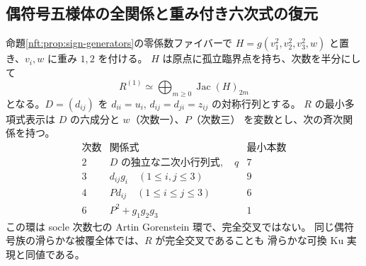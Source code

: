\subsection{偶符号五様体の全関係と重み付き六次式の復元}

\begin{proposition}[重み付き六次式と最小関係]\label{nft:prop:sign-presentation}
命題\ref{nft:prop:sign-generators}の零係数ファイバーで
$H=g(v_1^2,v_2^2,v_3^2,w)$ と置き、$v_i,w$ に重み $1,2$ を付ける。
$H$ は原点に孤立臨界点を持ち、次数を半分にして
\[
 R^{(1)}\simeq\bigoplus_{m\ge0}\operatorname{Jac}(H)_{2m}
\]
となる。$D=(d_{ij})$ を $d_{ii}=u_i$, $d_{ij}=d_{ji}=z_{ij}$ の対称行列とする。
$R$ の最小多項式表示は $D$ の六成分と $w$（次数一）、$P$（次数三）
を変数とし、次の斉次関係を持つ。
\[
 \begin{array}{c|l|c}
  \text{次数}&\text{関係式}&\text{最小本数}\\ \hline
 2&D\text{ の独立な二次小行列式},\quad q&7\\
 3&d_{ij}g_i\quad(1\le i,j\le3)&9\\
 4&Pd_{ij}\quad(1\le i\le j\le3)&6\\
 6&P^2+g_1g_2g_3&1
 \end{array}
\]
この環は socle 次数七の Artin Gorenstein 環で、完全交叉ではない。
同じ偶符号族の滑らかな被覆全体では、$R$ が完全交叉であることも
滑らかな可換 Ku 実現と同値である。
\end{proposition}
